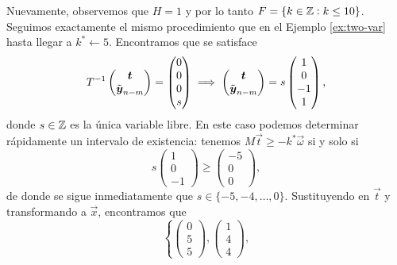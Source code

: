 \begin{example}
	Nuevamente, observemos que $H = 1$ y por lo tanto $F = \lbrace k \in \mathbb{Z} \vcentcolon k \leq 10
	\rbrace$. Seguimos exactamente el mismo procedimiento que en el Ejemplo \ref{ex:two-var} hasta
	llegar a $k^* \leftarrow 5$. Encontramos que se satisface
	\begin{equation*}
		T^{-1} \begin{pmatrix} \boldsymbol{t} \\ \tilde{\boldsymbol{y}}_{n-m} \end{pmatrix}
		=
		\begin{pmatrix} 0 \\ 0 \\ 0 \\ s \end{pmatrix}
		\implies
		\begin{pmatrix} \boldsymbol{t} \\ \tilde{\boldsymbol{y}}_{n-m} \end{pmatrix}
		=
		s \begin{pmatrix} 1 \\ 0 \\ -1 \\ 1 \end{pmatrix},
	\end{equation*}
	donde $s \in \mathbb{Z}$ es la única variable libre. En este caso podemos determinar rápidamente un
	intervalo de existencia: tenemos $M\vec{t} \geq -k^*\vec{\omega}$ si y solo si
	\begin{equation*}
		s\begin{pmatrix} 1 \\ 0 \\ -1 \end{pmatrix} \geq
		\begin{pmatrix} -5 \\ 0 \\ 0 \end{pmatrix},
	\end{equation*}
	de donde se sigue inmediatamente que $s \in \lbrace -5, -4, \ldots, 0 \rbrace$. Sustituyendo en
	$\vec{t}$ y transformando a $\vec{x}$, encontramos que
	\begin{equation*}
		\left\lbrace
			\begin{pmatrix} 0 \\ 5 \\ 5 \end{pmatrix},
			\begin{pmatrix} 1 \\ 4 \\ 4 \end{pmatrix},

\end{equation*}
\end{example}
